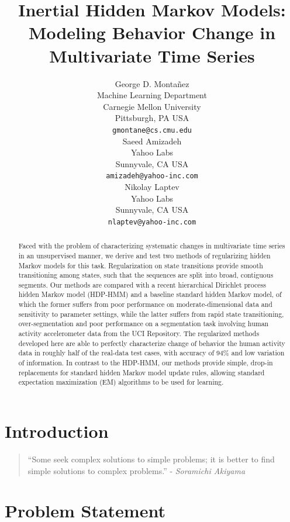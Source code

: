 \documentclass[letterpaper]{article}
\title{Inertial
Hidden Markov Models: Modeling Behavior Change in Multivariate Time Series}
\author{George D. Monta\~nez \\
Machine Learning Department\\
Carnegie Mellon University\\
Pittsburgh, PA USA\\
\texttt{gmontane@cs.cmu.edu} \\
\And
Saeed Amizadeh\\
Yahoo Labs\\
Sunnyvale, CA USA\\
\texttt{amizadeh@yahoo-inc.com}\\
\And
Nikolay Laptev\\
Yahoo Labs\\
Sunnyvale, CA USA\\
\texttt{nlaptev@yahoo-inc.com}}
\newenvironment{dedication}
        {\vspace{0.0ex}\begin{quotation}\begin{center}\begin{em}}
        {\par\end{em}\end{center}\end{quotation}}
\begin{document}
\maketitle

\begin{abstract}
    Faced with the problem of characterizing systematic changes in multivariate
    time series in an unsupervised manner, we derive and test two methods of regularizing hidden
    Markov models for this task. Regularization on state transitions provide
    smooth transitioning among states, such that the sequences are split into
    broad, contiguous segments. Our methods are compared with a recent
    hierarchical Dirichlet process hidden Markov model (HDP-HMM) and a baseline
    standard hidden Markov model, of which the former suffers from poor
    performance on moderate-dimensional data and sensitivity to parameter
    settings, while the latter suffers from rapid state transitioning,
    over-segmentation and poor performance on a segmentation task involving
    human activity accelerometer data from the UCI Repository.
    The regularized methods developed here are able to perfectly characterize
    change of behavior the human activity data in roughly half of the real-data
    test cases, with accuracy of 94\% and low variation of information. In contrast to the
    HDP-HMM, our methods provide simple, drop-in replacements for standard
    hidden Markov model update rules, allowing standard expectation maximization
    (EM) algorithms to be used for learning. 
\end{abstract}

\section{Introduction}
\begin{dedication} ``Some seek complex solutions to simple problems; it is better to find simple solutions to complex problems.'' - \emph{Soramichi Akiyama}
\end{dedication}



\section{Problem Statement}
\end{document}
